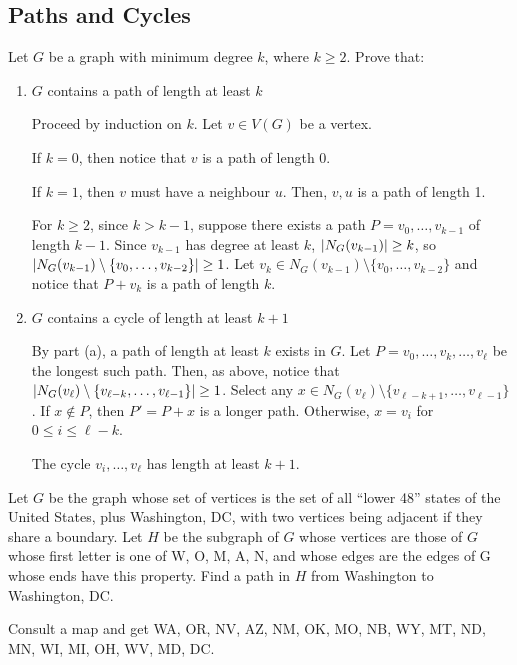 \documentclass[class=math239,notes,tikz]{agony}
\begin{document}
\subsection{Paths and Cycles}
\begin{xca}
  Let $G$ be a graph with minimum degree $k$, where $k \geq 2$.
  Prove that:
\end{xca}
\begin{enumerate}
  \item $G$ contains a path of length at least $k$
        \begin{prf}
          Proceed by induction on $k$.
          Let $v \in V(G)$ be a vertex.

          If $k = 0$, then notice that $v$ is a path of length 0.

          If $k = 1$, then $v$ must have a neighbour $u$.
          Then, $v,u$ is a path of length 1.

          For $k \geq 2$, since $k > k-1$, suppose
          there exists a path $P = v_0,\dotsc,v_{k-1}$ of length $k-1$.
          Since $v_{k-1}$ has degree at least $k$, $\abs{N_G(v_{k-1})} \geq k$,
          so $\abs{N_G(v_{k-1}) \setminus \{v_0,\dotsc,v_{k-2}\}} \geq 1$.
          Let $v_k \in N_G(v_{k-1}) \setminus \{v_0,\dotsc,v_{k-2}\}$
          and notice that $P + v_k$ is a path of length $k$.
        \end{prf}
  \item $G$ contains a cycle of length at least $k+1$
        \begin{prf}
          By part (a), a path of length at least $k$ exists in $G$.
          Let $P = v_0,\dotsc,v_k,\dotsc,v_\ell$ be the longest such path.
          Then, as above, notice that $\abs{N_G(v_\ell) \setminus \{v_{\ell-k},\dotsc,v_{\ell-1}\}} \geq 1$.
          Select any $x \in N_G(v_\ell) \setminus \{v_{\ell-k+1},\dotsc,v_{\ell-1}\}$.
          If $x \not\in P$, then $P' = P + x$ is a longer path.
          Otherwise, $x = v_i$ for $0 \leq i \leq \ell-k$.

          The cycle $v_i,\dotsc,v_\ell$ has length at least $k+1$.
        \end{prf}
\end{enumerate}

\setcounter{xca}{3} %

\begin{xca}
  Let $G$ be the graph whose set of vertices is the set of all
  ``lower 48'' states of the United States, plus Washington, DC,
  with two vertices being adjacent if they share a boundary.
  Let $H$ be the subgraph of $G$ whose vertices are those of $G$
  whose first letter is one of W, O, M, A, N,
  and whose edges are the edges of G whose ends have this property.
  Find a path in $H$ from Washington to Washington, DC.
\end{xca}
\begin{sol}
  Consult a map and get WA, OR, NV, AZ, NM, OK, MO, NB, WY, MT, ND, MN, WI, MI, OH, WV, MD, DC.
\end{sol}
\end{document}
